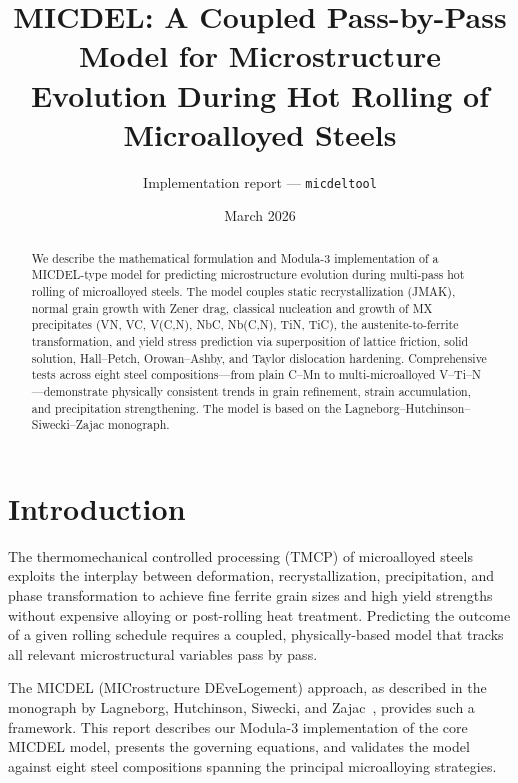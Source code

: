 \documentclass[11pt,a4paper]{article}
\title{MICDEL: A Coupled Pass-by-Pass Model for Microstructure \\
  Evolution During Hot Rolling of Microalloyed Steels}
\author{Implementation report --- \texttt{micdeltool}}
\date{March 2026}
\begin{document}
\maketitle

\begin{abstract}
We describe the mathematical formulation and Modula-3 implementation of a
MICDEL-type model for predicting microstructure evolution during multi-pass hot
rolling of microalloyed steels.  The model couples static recrystallization
(JMAK), normal grain growth with Zener drag, classical nucleation and growth of
MX precipitates (VN, VC, V(C,N), NbC, Nb(C,N), TiN, TiC), the
austenite-to-ferrite transformation, and yield stress prediction via
superposition of lattice friction, solid solution, Hall--Petch, Orowan--Ashby,
and Taylor dislocation hardening.  Comprehensive tests across eight steel
compositions---from plain C--Mn to multi-microalloyed V--Ti--N---demonstrate
physically consistent trends in grain refinement, strain accumulation, and
precipitation strengthening.  The model is based on the
Lagneborg--Hutchinson--Siwecki--Zajac monograph.
\end{abstract}

\tableofcontents

\section{Introduction}

The thermomechanical controlled processing (TMCP) of microalloyed steels
exploits the interplay between deformation, recrystallization, precipitation,
and phase transformation to achieve fine ferrite grain sizes and high yield
strengths without expensive alloying or post-rolling heat treatment.  Predicting
the outcome of a given rolling schedule requires a coupled, physically-based
model that tracks all relevant microstructural variables pass by pass.

The MICDEL (MICrostructure DEveLogement) approach, as described in the
monograph by Lagneborg, Hutchinson, Siwecki, and Zajac~\cite{lagneborg}, provides
such a framework.  This report describes our Modula-3 implementation of the core
MICDEL model, presents the governing equations, and validates the model against
eight steel compositions spanning the principal microalloying strategies.

\end{document}
